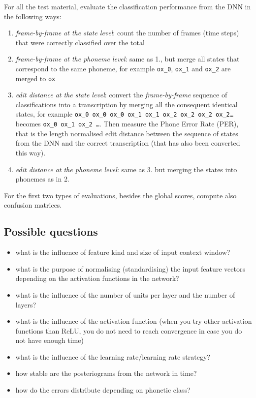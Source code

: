 \documentclass{nada-ten}
\begin{document}
For all the test material, evaluate the classification performance from the DNN in the following ways:
\begin{enumerate}
\item \emph{frame-by-frame at the state level}: count the number of frames (time steps) that were correctly classified over the total
\item \emph{frame-by-frame at the phoneme level}: same as 1., but merge all states that correspond to the same phoneme, for example \texttt{ox\_0}, \texttt{ox\_1} and \texttt{ox\_2} are merged to \texttt{ox}
\item \emph{edit distance at the state level}: convert the \emph{frame-by-frame} sequence of classifications into a transcription by merging all the consequent identical states, for example \texttt{ox\_0 ox\_0 ox\_0 ox\_1 ox\_1 ox\_2 ox\_2 ox\_2 ox\_2\dots} becomes \texttt{ox\_0 ox\_1 ox\_2 \dots}. Then measure the Phone Error Rate (PER), that is the length normalised edit distance between the sequence of states from the DNN and the correct transcription (that has also been converted this way).
\item \emph{edit distance at the phoneme level}: same as 3. but merging the states into phonemes as in 2.
\end{enumerate}
For the first two types of evaluations, besides the global scores, compute also confusion matrices.

\subsection{Possible questions}
\begin{itemize}
\item what is the influence of feature kind and size of input context window?
\item what is the purpose of normalising (standardising) the input feature vectors depending on the activation functions in the network?
\item what is the influence of the number of units per layer and the number of layers?
\item what is the influence of the activation function (when you try other activation functions than ReLU, you do not need to reach convergence in case you do not have enough time)
\item what is the influence of the learning rate/learning rate strategy?
\item how stable are the posteriograms from the network in time?
\item how do the errors distribute depending on phonetic class?
\end{itemize}
\end{document}
